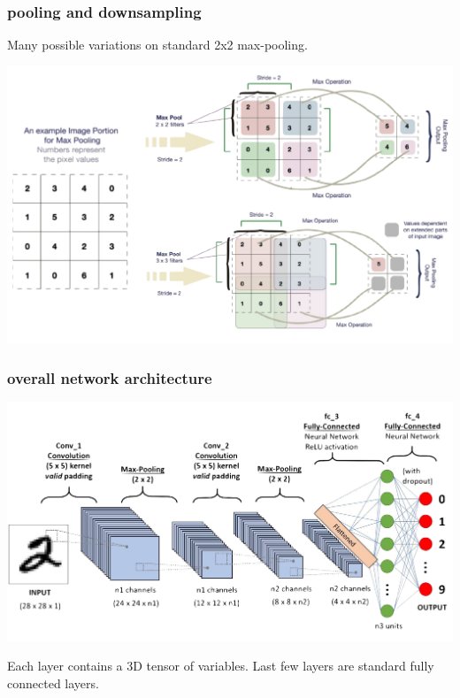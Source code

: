 \documentclass[handout,compress]{beamer}
\begin{document}
	\begin{frame}
	\frametitle{pooling and downsampling}
	Many possible variations on standard 2x2 max-pooling.
	\begin{center}
		\includegraphics[width=\textwidth]{pooling_advanced.png}
	\end{center}
	\end{frame}

	\begin{frame}
	\frametitle{overall network architecture}
	\begin{center}
		\includegraphics[width=\textwidth]{conv_net.png}
		
		Each layer contains a 3D tensor of variables. Last few layers are standard fully connected layers. 
	\end{center}
	\end{frame}
\end{document}
